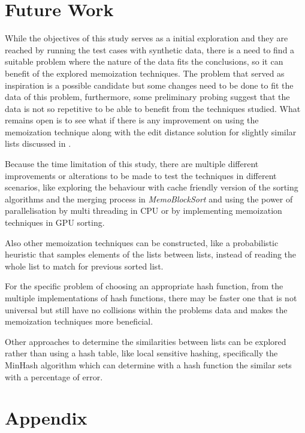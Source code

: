 \documentclass[a4paper,12pt]{article}
\begin{document}
\section{Future Work}

While the objectives of this study serves as a initial exploration and they are reached by running the test cases with synthetic data, there is a need to find a suitable problem where the nature of the data fits the conclusions, so it can benefit of  the explored memoization techniques. The problem that served as inspiration \cite{Arch2015} is a possible candidate but some changes need to be done to fit the data of this problem, furthermore, some preliminary probing suggest that the data is not so repetitive to be able to benefit from the techniques studied. What remains open is to see what if there is any improvement on using the memoization technique along with the edit distance solution for slightly similar lists discussed in \cite{Arch2015}.

Because the time limitation of this study, there are multiple different improvements or alterations to be made to test the techniques in different scenarios, like exploring the behaviour with cache friendly version of the sorting algorithms and the merging process in {\it MemoBlockSort} and using the power of parallelisation by multi threading in CPU or by implementing memoization techniques in GPU sorting.

Also other memoization techniques can be constructed, like a probabilistic heuristic that samples elements of the lists between lists, instead of reading the whole list to match for previous sorted list.

For the specific problem of choosing an appropriate hash function, from the multiple implementations of hash functions, there may be faster one that is not universal but still have no collisions within the problems data and makes the memoization techniques more beneficial.

Other approaches to determine the similarities between lists can be explored rather than using a hash table, like local sensitive hashing, specifically the MinHash algorithm which can determine with a hash function the similar sets with a percentage of error.






\section{Appendix}
\end{document}
